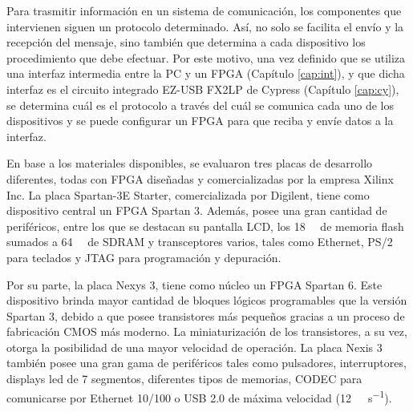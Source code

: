 
Para trasmitir información en un sistema de comunicación, los componentes que intervienen siguen un protocolo determinado. Así, no solo se facilita el envío y la recepción del mensaje, sino también que determina a cada dispositivo los procedimiento que debe efectuar. Por este motivo, una vez definido que se utiliza una interfaz intermedia entre la PC y un FPGA (Capítulo \ref{cap:int}), y que dicha interfaz es el circuito integrado EZ-USB FX2LP de Cypress (Capítulo \ref{cap:cy}), se determina cuál es el protocolo a través del cuál se comunica cada uno de los dispositivos y se puede configurar un FPGA para que reciba y envíe datos a la interfaz.

En base a los materiales disponibles, se evaluaron tres placas de desarrollo diferentes, todas con FPGA diseñadas y comercializadas por la empresa Xilinx Inc. La placa Spartan-3E Starter, comercializada por Digilent, tiene como dispositivo central un FPGA Spartan 3. Además, posee una gran cantidad de periféricos, entre los que se destacan su pantalla LCD, los \SI{18}{\mega\byte} de memoria flash sumados a \SI{64}{\mega\byte} de SDRAM y transceptores varios, tales como Ethernet, PS/2 para teclados y JTAG para programación y depuración.

Por su parte, la placa Nexys 3, tiene como núcleo un FPGA Spartan 6. Este dispositivo brinda mayor cantidad de bloques lógicos programables que la versión Spartan 3, debido a que posee transistores más pequeños gracias a un proceso de fabricación CMOS más moderno. La miniaturización de los transistores, a su vez, otorga la posibilidad de una mayor velocidad de operación. La placa Nexis 3 también posee una gran gama de periféricos tales como pulsadores, interruptores, displays led de 7 segmentos, diferentes tipos de memorias, CODEC para comunicarse por Ethernet 10/100 o USB 2.0 de máxima velocidad (\SI{12}{\mega\bit\per\second}).

